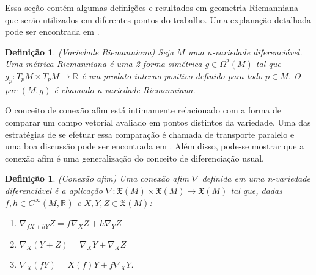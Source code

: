 \documentclass[12pt]{book}
\newtheorem{definicao}[teorema]{Definição}
\newcommand{\campossuaves}[1]{\mathfrak{X}(#1)}
\newcommand{\funcoessuaves}[1]{C^{\infty}(#1, \real{})}
\newcommand{\real}[1]{\mathbb{R}^{#1}}
\begin{document}
	Essa seção contém algumas definições e resultados em geometria Riemanniana que serão utilizados em diferentes pontos do trabalho. Uma explanação detalhada pode ser encontrada em \cite{manfredo_riemannian_geo}.
	
	\begin{definicao}\label{definicao_variedade_riemanniana}
		(Variedade Riemanniana) Seja $M$ uma n-variedade diferenciável. Uma métrica Riemanniana é uma 2-forma simétrica $g \in \Omega^{2}(M)$ tal que $g_{p}:T_{p}M \times T_{p}M \to \real{}$ é um produto interno positivo-definido para todo $p \in M$. O par $(M, g)$ é chamado n-variedade Riemanniana.
	\end{definicao}
	
	O conceito de conexão afim está intimamente relacionado com a forma de comparar um campo vetorial avaliado em pontos distintos da variedade. Uma das estratégias de se efetuar essa comparação é chamada de transporte paralelo e uma boa discussão pode ser encontrada em \cite{nakahara}. Além disso, pode-se mostrar que a conexão afim é uma generalização do conceito de diferenciação usual.
	
	\begin{definicao}\label{definicao_conexao_afim}
		(Conexão afim) Uma conexão afim $\nabla$ definida em uma n-variedade diferenciável é a aplicação $\nabla: \campossuaves{M} \times \campossuaves{M} \to \campossuaves{M}$ tal que, dadas $f,h \in \funcoessuaves{M}$ e $X,Y,Z \in \campossuaves{M}$:
		\begin{enumerate}
			\item $\nabla_{fX+hY}Z = f\nabla_{X}Z+h\nabla_{Y}Z$
			\item $\nabla_{X}(Y+Z) = \nabla_{X}Y+ \nabla_{X}Z$
			\item $\nabla_{X}(fY) = X(f)Y+f\nabla_{X}Y$.
		\end{enumerate}
	\end{definicao}
	
\end{document}
